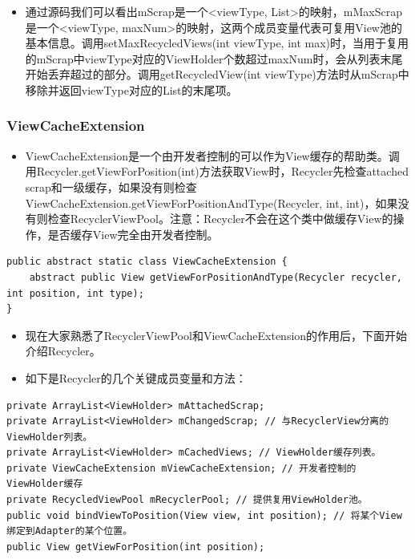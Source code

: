 \documentclass[9pt, b5paper]{article}
\begin{document}
\begin{itemize}
\item 通过源码我们可以看出mScrap是一个<viewType, List>的映射，mMaxScrap是一个<viewType, maxNum>的映射，这两个成员变量代表可复用View池的基本信息。调用setMaxRecycledViews(int viewType, int max)时，当用于复用的mScrap中viewType对应的ViewHolder个数超过maxNum时，会从列表末尾开始丢弃超过的部分。调用getRecycledView(int viewType)方法时从mScrap中移除并返回viewType对应的List的末尾项。
\end{itemize}

\subsubsection{ViewCacheExtension}
\label{sec-5-3-9}
\begin{itemize}
\item ViewCacheExtension是一个由开发者控制的可以作为View缓存的帮助类。调用Recycler.getViewForPosition(int)方法获取View时，Recycler先检查attached scrap和一级缓存，如果没有则检查ViewCacheExtension.getViewForPositionAndType(Recycler, int, int)，如果没有则检查RecyclerViewPool。注意：Recycler不会在这个类中做缓存View的操作，是否缓存View完全由开发者控制。
\end{itemize}
\begin{verbatim}
public abstract static class ViewCacheExtension {
    abstract public View getViewForPositionAndType(Recycler recycler, int position, int type);
}
\end{verbatim}
\begin{itemize}
\item 现在大家熟悉了RecyclerViewPool和ViewCacheExtension的作用后，下面开始介绍Recycler。
\item 如下是Recycler的几个关键成员变量和方法：
\end{itemize}
\begin{verbatim}
private ArrayList<ViewHolder> mAttachedScrap;
private ArrayList<ViewHolder> mChangedScrap; // 与RecyclerView分离的ViewHolder列表。
private ArrayList<ViewHolder> mCachedViews; // ViewHolder缓存列表。
private ViewCacheExtension mViewCacheExtension; // 开发者控制的ViewHolder缓存
private RecycledViewPool mRecyclerPool; // 提供复用ViewHolder池。
public void bindViewToPosition(View view, int position); // 将某个View绑定到Adapter的某个位置。
public View getViewForPosition(int position);
\end{verbatim}
\end{document}
